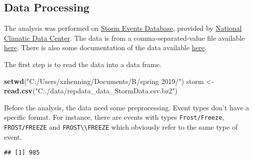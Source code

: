 \documentclass[]{article}
\newenvironment{Shaded}{\begin{snugshade}}{\end{snugshade}}
\newcommand{\KeywordTok}[1]{\textcolor[rgb]{0.13,0.29,0.53}{\textbf{#1}}}
\newcommand{\StringTok}[1]{\textcolor[rgb]{0.31,0.60,0.02}{#1}}
\newcommand{\CommentTok}[1]{\textcolor[rgb]{0.56,0.35,0.01}{\textit{#1}}}
\newcommand{\OperatorTok}[1]{\textcolor[rgb]{0.81,0.36,0.00}{\textbf{#1}}}
\newcommand{\NormalTok}[1]{#1}
\begin{document}
\subsection{Data Processing}\label{data-processing}

The analysis was performed on
\href{http://www.ncdc.noaa.gov/stormevents/ftp.jsp}{Storm Events
Database}, provided by \href{http://www.ncdc.noaa.gov/}{National
Climatic Data Center}. The data is from a comma-separated-value file
available
\href{https://d396qusza40orc.cloudfront.net/repdata\%2Fdata\%2FStormData.csv.bz2}{here}.
There is also some documentation of the data available
\href{https://d396qusza40orc.cloudfront.net/repdata\%2Fpeer2_doc\%2Fpd01016005curr.pdf}{here}.

The first step is to read the data into a data frame.

\begin{Shaded}
\begin{Highlighting}[]
\KeywordTok{setwd}\NormalTok{(}\StringTok{"C:/Users/xzhenning/Documents/R/spring 2019/"}\NormalTok{)}
\NormalTok{storm <-}\StringTok{ }\KeywordTok{read.csv}\NormalTok{(}\StringTok{"C:./data/repdata_data_StormData.csv.bz2"}\NormalTok{)}
\end{Highlighting}
\end{Shaded}

Before the analysis, the data need some preprocessing. Event types don't
have a specific format. For instance, there are events with types
\texttt{Frost/Freeze}, \texttt{FROST/FREEZE} and
\texttt{FROST\textbackslash{}\textbackslash{}FREEZE} which obviously
refer to the same type of event.

\begin{Shaded}
\end{Shaded}

\begin{verbatim}
## [1] 985
\end{verbatim}

\begin{Shaded}
\end{Shaded}
\end{document}
